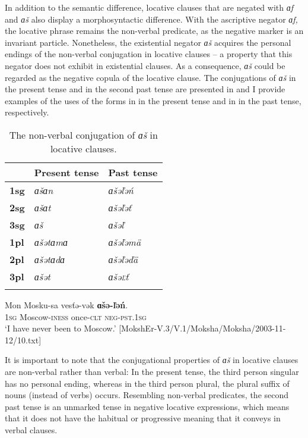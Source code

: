 \documentclass[output=paper]{langsci/langscibook}
\begin{document}
  In addition to the semantic difference, locative clauses that are negated with \textit{ɑf} and \textit{ɑš} also display a morphosyntactic difference. With the ascriptive negator \textit{ɑf,} the locative phrase remains the non-verbal predicate, as the negative marker is an invariant particle. Nonetheless, the existential negator \textit{ɑš} acquires the personal endings of the non-verbal conjugation in locative clauses -- a property that this negator does not exhibit in existential clauses. As a consequence, \textit{ɑš} could be regarded as the negative copula of the locative clause. The conjugations of \textit{ɑš} in the present tense and in the second past tense are presented in  and I provide examples of the uses of the forms in  in the present tense and in  in the past tense, respectively.

\begin{table}
\caption{The non-verbal conjugation of \textit{ɑš} in locative clauses.}
\label{tab:2:5}
\begin{tabularx}{.5\textwidth}{l Q Q}
\lsptoprule
			&\textbf{Present tense}	&\textbf{Past tense}\\
\midrule
\textbf{1sg}	&\textit{ɑšɑn}			&\textit{ɑšəľəń}\\
\textbf{2sg}	&\textit{ɑšɑt}			&\textit{ɑšəľəť}\\
\textbf{3sg}	&\textit{ɑš}			&\textit{ɑšəľ}\\
\textbf{1pl}	&\textit{ɑšətɑmɑ}		&\textit{ɑšəľəmä}\\
\textbf{2pl}	&\textit{ɑšətɑdɑ}		&\textit{ɑšəľəďä}\\
\textbf{3pl}	&\textit{ɑšət}			&\textit{ɑšə\textsc{ľ}ť}\\
\lspbottomrule
\end{tabularx}
\end{table}

\ea\label{ex:moksha-never-Moscow}
\gll Mon Mosku-sa vesťə-vək \textbf{ɑšə-ľəń}.\\
\textsc{1sg} Moscow-\textsc{iness} once-\textsc{clt} \textsc{neg-pst.1sg}\\
\glt `I have never been to Moscow.' [MokshEr-V.3/V.1/Moksha/Moksha/2003-11-12/10.txt]
\z

It is important to note that the conjugational properties of \textit{ɑš}
in locative clauses are non-verbal rather than verbal: In the present
tense, the third person singular has no personal ending, whereas in the
third person plural, the plural suffix of nouns (instead of verbs)
occurs. Resembling non-verbal predicates, the second past tense is an
unmarked tense in negative locative expressions, which means that it does
not have the habitual or progressive meaning that it conveys in verbal clauses.
\end{document}
